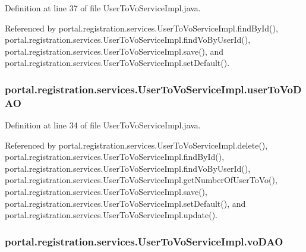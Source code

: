 Definition at line 37 of file UserToVoServiceImpl.java.



Referenced by portal.registration.services.UserToVoServiceImpl.findById(), portal.registration.services.UserToVoServiceImpl.findVoByUserId(), portal.registration.services.UserToVoServiceImpl.save(), and portal.registration.services.UserToVoServiceImpl.setDefault().

\hypertarget{classportal_1_1registration_1_1services_1_1UserToVoServiceImpl_a2601e092ad2cd9e5ace07ec16db395bd}{
\subsubsection[{userToVoDAO}]{ {\bf portal.registration.services.UserToVoServiceImpl.userToVoDAO}}}
\label{classportal_1_1registration_1_1services_1_1UserToVoServiceImpl_a2601e092ad2cd9e5ace07ec16db395bd}


Definition at line 34 of file UserToVoServiceImpl.java.



Referenced by portal.registration.services.UserToVoServiceImpl.delete(), portal.registration.services.UserToVoServiceImpl.findById(), portal.registration.services.UserToVoServiceImpl.findVoByUserId(), portal.registration.services.UserToVoServiceImpl.getNumberOfUserToVo(), portal.registration.services.UserToVoServiceImpl.save(), portal.registration.services.UserToVoServiceImpl.setDefault(), and portal.registration.services.UserToVoServiceImpl.update().

\hypertarget{classportal_1_1registration_1_1services_1_1UserToVoServiceImpl_a0eb772d6b45bde5ccc9b55dc1638eafa}{
\subsubsection[{voDAO}]{ {\bf portal.registration.services.UserToVoServiceImpl.voDAO}}}
\label{classportal_1_1registration_1_1services_1_1UserToVoServiceImpl_a0eb772d6b45bde5ccc9b55dc1638eafa}


